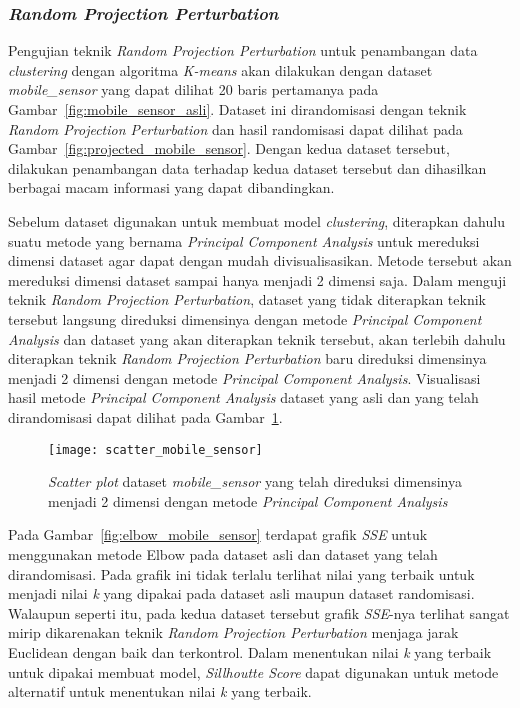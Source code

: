 \subsubsection{\textit{Random Projection Perturbation}}
\label{sec:pengujian-clustering-rpp}

Pengujian teknik \textit{Random Projection Perturbation} untuk penambangan data \textit{clustering} dengan algoritma \textit{K-means} akan dilakukan dengan dataset \textit{mobile\_sensor} yang dapat dilihat 20 baris pertamanya pada Gambar~\ref{fig:mobile_sensor_asli}. Dataset ini dirandomisasi dengan teknik \textit{Random Projection Perturbation} dan hasil randomisasi dapat dilihat pada Gambar~\ref{fig:projected_mobile_sensor}. Dengan kedua dataset tersebut, dilakukan penambangan data terhadap kedua dataset tersebut dan dihasilkan berbagai macam informasi yang dapat dibandingkan.

Sebelum dataset digunakan untuk membuat model \textit{clustering}, diterapkan dahulu suatu metode yang bernama \textit{Principal Component Analysis} untuk mereduksi dimensi dataset agar dapat dengan mudah divisualisasikan. Metode tersebut akan mereduksi dimensi dataset sampai hanya menjadi 2 dimensi saja. Dalam menguji teknik \textit{Random Projection Perturbation}, dataset yang tidak diterapkan teknik tersebut langsung direduksi dimensinya dengan metode \textit{Principal Component Analysis} dan dataset yang akan diterapkan teknik tersebut, akan terlebih dahulu diterapkan teknik \textit{Random Projection Perturbation} baru direduksi dimensinya menjadi 2 dimensi dengan metode \textit{Principal Component Analysis}. Visualisasi hasil metode \textit{Principal Component Analysis} dataset yang asli dan yang telah dirandomisasi dapat dilihat pada Gambar~\ref{fig:scatter_mobile_sensor}.

\begin{figure}
	\centering
	\texttt{[image: scatter\_mobile\_sensor]}
	\caption{\textit{Scatter plot} dataset \textit{mobile\_sensor} yang telah direduksi dimensinya menjadi 2 dimensi dengan metode \textit{Principal Component Analysis}}
	\label{fig:scatter_mobile_sensor}
\end{figure}

Pada Gambar~\ref{fig:elbow_mobile_sensor} terdapat grafik \textit{SSE} untuk menggunakan metode Elbow pada dataset asli dan dataset yang telah dirandomisasi. Pada grafik ini tidak terlalu terlihat nilai yang terbaik untuk menjadi nilai \textit{k} yang dipakai pada dataset asli maupun dataset randomisasi. Walaupun seperti itu, pada kedua dataset tersebut grafik \textit{SSE}-nya terlihat sangat mirip dikarenakan teknik \textit{Random Projection Perturbation} menjaga jarak Euclidean dengan baik dan terkontrol. Dalam menentukan nilai \textit{k} yang terbaik untuk dipakai membuat model, \textit{Sillhoutte Score} dapat digunakan untuk metode alternatif untuk menentukan nilai \textit{k} yang terbaik.

